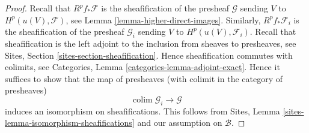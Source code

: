 \documentclass[10pt,a4paper]{amsart}
\theoremstyle{plain}
\theoremstyle{definition}
\theoremstyle{remark}
\numberwithin{equation}{subsection}
\def\colim{\mathop{\mathrm{colim}}\nolimits}
\begin{document}
\begin{proof}
Recall that $R^pf_*\mathcal{F}$ is the sheafification of the presheaf
$\mathcal{G}$ sending $V$ to $H^p(u(V), \mathcal{F})$, see
Lemma \ref{lemma-higher-direct-images}. Similarly, 
$R^pf_*\mathcal{F}_i$ is the sheafification of the presheaf
$\mathcal{G}_i$ sending $V$ to $H^p(u(V), \mathcal{F}_i)$.
Recall that sheafification is the left adjoint to the inclusion
from sheaves to presheaves, see Sites, Section
\ref{sites-section-sheafification}. Hence sheafification commutes
with colimits, see Categories, Lemma \ref{categories-lemma-adjoint-exact}.
Hence it suffices to show that the map of presheaves (with colimit
in the category of presheaves)
$$
\colim \mathcal{G}_i \longrightarrow \mathcal{G}
$$
induces an isomorphism on sheafifications. This follows from
Sites, Lemma \ref{sites-lemma-isomorphism-sheafifications} and
our assumption on $\mathcal{B}$.
\end{proof}
\end{document}
